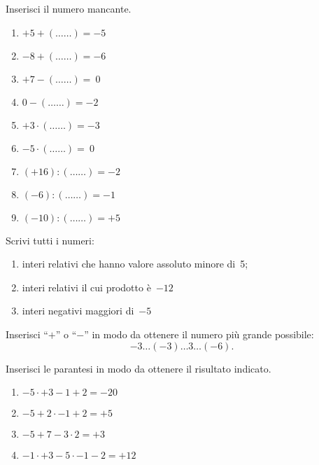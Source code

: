 \begin{esercizio}
Inserisci il numero mancante.
 \begin{multicols}{3}
 \begin{enumerate}[noitemsep, label=(\alph*)]
 \item \(+5 + (\ldots\ldots) = -5\)
 \item \(-8 + (\ldots\ldots) = -6\)
 \item \(+7 - (\ldots\ldots) =~0\)
 \item \(0 - (\ldots\ldots) = -2\)
 \item \(+3\cdot (\ldots\ldots) = -3\)
 \item \(-5\cdot (\ldots\ldots) =~0\)
 \item \((+16): (\ldots\ldots) = -2\)
 \item \((-6): (\ldots\ldots) = -1\)
 \item \((-10): (\ldots\ldots) = +5\)
 \end{enumerate}
 \end{multicols}
\end{esercizio}

\begin{esercizio}
 Scrivi tutti i numeri:
 \begin{enumerate}[noitemsep, label=(\alph*)]
 \item interi relativi che hanno valore assoluto minore di~5;
 \item interi relativi il cui prodotto è~\(-12\)
 \item interi negativi maggiori di~\(-5\)
 \end{enumerate}
\end{esercizio}

\begin{esercizio}
Inserisci ``\(+\)'' o ``\(-\)'' in modo da ottenere il numero più grande 
possibile:
 \[-3\ldots(-3)\ldots3\ldots(-6).\]
\end{esercizio}

\begin{esercizio}
Inserisci le parantesi in modo da ottenere il risultato indicato.
 \begin{multicols}{2}
 \begin{enumerate}[noitemsep, label=(\alph*)]
 \item \(-5 \cdot +3-1+2=-20\)
 \item \(-5+2\cdot-1+2=+5\)
 \item \(-5+7-3\cdot 2=+3\)
 \item \(-1\cdot +3-5\cdot -1-2=+12\)
 \end{enumerate}
 \end{multicols}
\end{esercizio}

